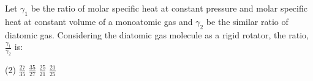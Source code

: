 \item Let $\gamma_1$ be the ratio of molar specific heat at constant pressure and molar specific heat at constant volume of a monoatomic gas and $\gamma_2$ be the similar ratio of diatomic gas. Considering the diatomic gas molecule as a rigid rotator, the ratio, $\frac{\gamma_1}{\gamma_2}$ is:
    \begin{tasks}(2)
        \task $\frac{27}{35}$
        \task $\frac{35}{27}$
        \task $\frac{25}{21}$
        \task $\frac{21}{25}$
    \end{tasks}